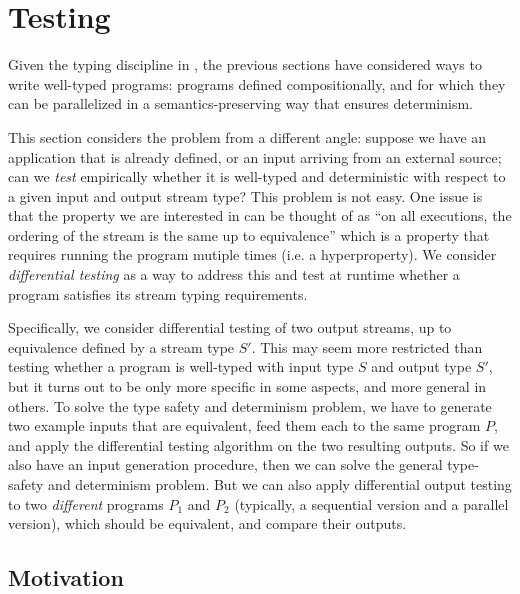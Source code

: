 \chapter{Testing}
\label{cha:testing}

Given the typing discipline in , the previous sections have considered ways to write well-typed programs: programs defined compositionally, and for which they can be parallelized in a semantics-preserving way that ensures determinism.

This section considers the problem from a different angle: suppose we have an application that is already defined, or an input arriving from an external source; can we \emph{test} empirically whether it is well-typed and deterministic with respect to a given input and output stream type?
This problem is not easy. One issue is that the property we are interested in can be thought of as ``on all executions, the ordering of the stream is the same up to equivalence'' which is a property that requires running the program mutiple times (i.e. a hyperproperty).
We consider \emph{differential testing} as a way to address this and test at runtime whether a program satisfies its stream typing requirements.

Specifically, we consider differential testing of two output streams, up to equivalence defined by a stream type $S'$.
This may seem more restricted than testing whether a program is well-typed with input type $S$ and output type $S'$,
but it turns out to be only more specific in some aspects, and more general in others.
To solve the type safety and determinism problem, we have to generate two example inputs that are equivalent, feed them each to the same program $P$, and apply the differential testing algorithm on the two resulting outputs.
So if we also have an input generation procedure, then we can solve the general type-safety and determinism problem.
But we can also apply differential output testing to two \emph{different} programs $P_1$ and $P_2$ (typically, a sequential version and a parallel version), which should be equivalent, and compare their outputs.

\section{Motivation}
\label{diffstream:sec:introduction}

